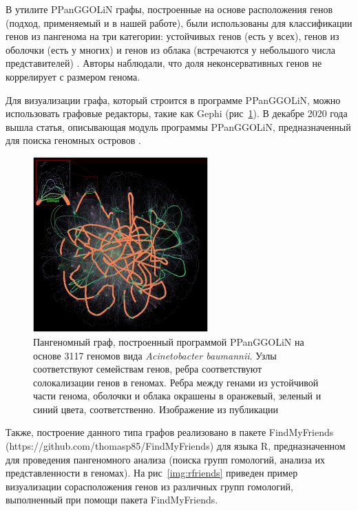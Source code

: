 В утилите PPanGGOLiN графы, построенные на основе расположения генов (подход, применяемый и в нашей работе), были использованы для классификации генов из пангенома на три категории: устойчивых генов (есть у всех), генов из оболочки (есть у многих) и генов из облака (встречаются у небольшого числа представителей) \cite{gautreau2020ppanggolin}. 
Авторы наблюдали, что доля неконсервативных генов не коррелирует с размером генома.  

Для визуализации графа, который строится в программе PPanGGOLiN, можно использовать графовые редакторы, такие как Gephi (рис~\ref{img:ppangolin}). В декабре 2020 года вышла статья, описывающая модуль программы PPanGGOLiN, предназначенный для поиска геномных островов \cite{bazin2020panrgp}.  

\begin{figure}[!ht] 
  \center
  \includegraphics [width=0.6\textwidth] {Dissertation/images/lit/ppangolin.jpg}
  \caption{Пангеномный граф, построенный программой PPanGGOLiN на основе 3117 геномов вида \textit{Acinetobacter baumannii}. Узлы соответствуют семействам генов, ребра соответствуют солокализации генов в геномах. Ребра между генами из устойчивой части генома, оболочки и облака окрашены в оранжевый, зеленый и синий цвета, соответственно. Изображение из публикации \cite{gautreau2020ppanggolin}} 
  \label{img:ppangolin}  
\end{figure}

Также, построение данного типа графов реализовано в пакете FindMyFriends (https://github.com/thomasp85/FindMyFriends) для языка R, предназначенном для проведения пангеномного анализа (поиска групп гомологий, анализа их представленности в геномах). На рис~\ref{img:rfriends} приведен пример визуализации сорасположения генов из различных групп гомологий, выполненный при помощи пакета FindMyFriends.

